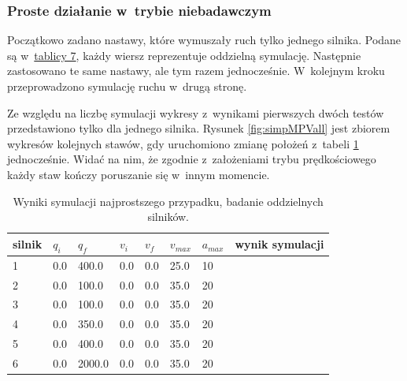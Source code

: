 \documentclass[a4paper, 12pt]{article}
\begin{document}
	\subsubsection{Proste działanie w~trybie niebadawczym}
	\label{sec:MPV}
	Początkowo zadano nastawy, które wymuszały ruch tylko jednego silnika. Podane są w~\hyperref[tab:setup1]{tablicy 7}, każdy wiersz reprezentuje oddzielną symulację. Następnie zastosowano te same nastawy, ale tym razem jednocześnie. W~kolejnym kroku przeprowadzono symulację ruchu w~drugą stronę. 	
	\par Ze względu na liczbę symulacji wykresy z~wynikami pierwszych dwóch testów przedstawiono tylko dla jednego silnika. Rysunek \ref{fig:simpMPVall} jest zbiorem wykresów kolejnych stawów, gdy uruchomiono zmianę położeń z~tabeli \ref{tab:setup1} jednocześnie. Widać na nim, że zgodnie z~założeniami trybu prędkościowego każdy staw kończy poruszanie się w~innym momencie.
	\newpage
	\begin{table}[H]
	\centering
	\begin{tabular}{|m{2.5em}|m{4em}|m{4em}|m{4em}|m{4em}|m{4em}|m{4em}|m{5em}|}
	\hline
	silnik&$ q_i $ & $ q_f $ & $ v_i $ & $ v_f $ & $ v_{max} $ & $ a_{max} $&wynik symulacji\\
	\hline
	\hline
	\hspace{1em}1& 0.0 & 400.0 & 0.0 & 0.0 & 25.0 & 10&\hspace{2em}\checkmark\\ %
	\hline
	\hspace{1em}2& 0.0 & 100.0 & 0.0 & 0.0 & 35.0 & 20&\hspace{2em}\checkmark\\  %
	\hline
	\hspace{1em}3& 0.0 & 100.0 & 0.0 & 0.0 & 35.0 & 20&\hspace{2em}\checkmark\\ %
	\hline
	\hspace{1em}4& 0.0 & 350.0 & 0.0 & 0.0 & 35.0 & 20&\hspace{2em}\checkmark\\  %
	\hline
	\hspace{1em}5& 0.0 & 400.0 & 0.0 & 0.0 & 35.0 & 20&\hspace{2em}\checkmark\\  %
	\hline
	\hspace{1em}6& 0.0 & 2000.0 & 0.0 & 0.0 & 35.0 & 20&\hspace{2em}\checkmark\\  %
	\hline
	\end{tabular}
	\caption{Wyniki symulacji najprostszego przypadku, badanie oddzielnych silników.}
	\label{tab:setup1}
	\end{table}
	
\end{document}
